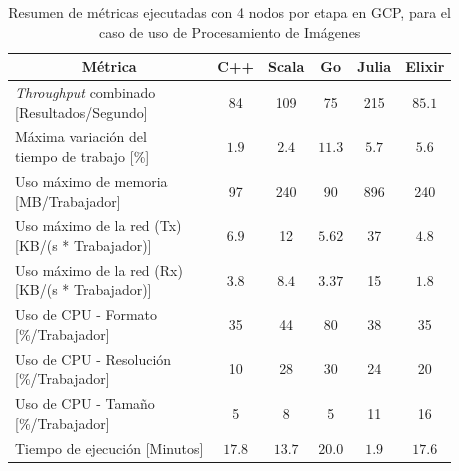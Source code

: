 \documentclass[11pt]{article}
\providecommand{\row}[1]{\parbox{150pt}{\setlength{\baselineskip}{0.2\baselineskip}\strut#1\strut}}
\newcommand{\english}[1]{\textit{#1}}
\begin{document}
\begin{table}[H]
\centering
\begin{tabular}{|l|c|c|c|c|c|}
\hline
\multicolumn{1}{|c|}{Métrica} & C++ & Scala & Go & Julia & Elixir \\ \hline
\row{\english{Throughput} combinado \\ {[Resultados/Segundo]}} & 84 & 109 & 75 & 215 & $85.1$ \\ \hline
\row{Máxima variación del \\ tiempo de trabajo {[}\%{]}} & $1.9$ & $2.4$ & $11.3$ & $5.7$ & $5.6$ \\ \hline
\row{Uso máximo de memoria \\ {[}MB/Trabajador{]}} & 97 & 240 & 90 & 896 & 240 \\ \hline
\row{Uso máximo de la red (Tx) \\ {[}KB/(s * Trabajador){]}} & $6.9$ & 12 & $5.62$ & 37 & $4.8$ \\ \hline
\row{Uso máximo de la red (Rx)\\ {[}KB/(s * Trabajador){]}} & $3.8$ & $8.4$ & $3.37$ & 15 & $1.8$ \\ \hline
\row{Uso de CPU - Formato \\ {[\%/Trabajador]}} & 35 & 44 & 80 & 38 & 35 \\ \hline
\row{Uso de CPU - Resolución \\ {[\%/Trabajador]}} & 10 & 28 & 30 & 24 & 20 \\ \hline
\row{Uso de CPU - Tamaño \\ {[\%/Trabajador]}} & 5 & 8 & 5 & 11 & 16 \\ \hline
Tiempo de ejecución {[}Minutos{]} & $17.8$ & $13.7$ & $20.0$ & $1.9$ & $17.6$ \\ \hline
\end{tabular}
\caption{Resumen de métricas ejecutadas con 4 nodos por etapa en GCP, para el caso de uso de Procesamiento de Imágenes}
\end{table}
\end{document}
